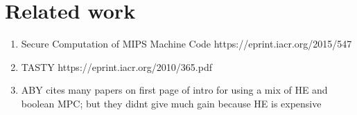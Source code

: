 \section{Related work}
\label{sec:related}

\begin{enumerate}
\item Secure Computation of MIPS Machine Code https://eprint.iacr.org/2015/547
\item TASTY https://eprint.iacr.org/2010/365.pdf
\item ABY cites many papers on first page of intro for using a mix of HE and boolean MPC; but they didnt give much gain because HE is expensive
\end{enumerate}